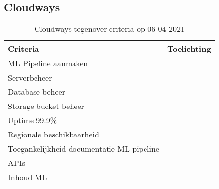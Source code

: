 \subsection*{Cloudways}\label{appendix:detailed-overview-of-cloud-computing-platforms:cloudways}
\begin{table}[hbt!]
  \centering
  \begin{tabular}{|p{.2\linewidth}|p{.74\linewidth}|}
  \hline
  \textbf{Criteria} & \textbf{Toelichting} \\ \hline
    ML Pipeline \newline aanmaken
    &

    \\ \hline

    Serverbeheer
    &

    \\ \hline

    Database beheer
    &

    \\ \hline

    Storage \newline bucket beheer
    &

    \\ \hline

    Uptime 99.9\%
    &

    \\ \hline

    Regionale \newline beschikbaarheid
    &

    \\ \hline

    Toegankelijkheid documentatie ML pipeline
    &

    \\ \hline

    APIs
    &

    \\ \hline

    Inhoud ML
    &

    \\ \hline
  \end{tabular}
  \caption{Cloudways tegenover criteria op 06-04-2021}
  \label{table:cloudways-against-criteria}
\end{table}

\newpage

